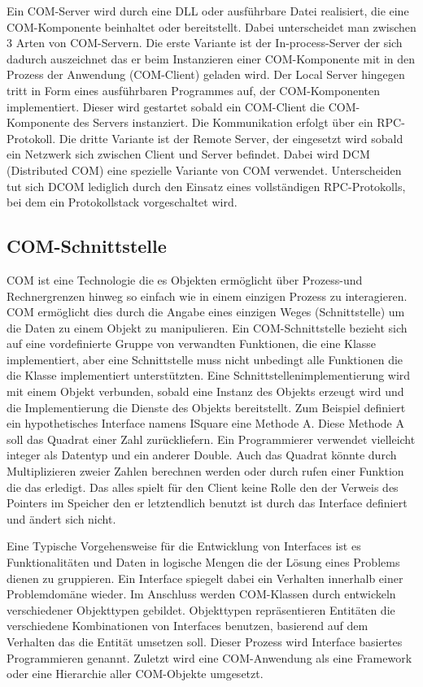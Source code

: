 Ein COM-Server wird durch eine DLL oder ausführbare Datei realisiert, die eine COM-Komponente beinhaltet oder bereitstellt. Dabei unterscheidet man zwischen 3 Arten von COM-Servern. Die erste Variante ist der In-process-Server der sich dadurch auszeichnet das er beim Instanzieren einer COM-Komponente mit in den Prozess der Anwendung (COM-Client) geladen wird. Der Local Server hingegen tritt in Form eines ausführbaren Programmes auf, der COM-Komponenten implementiert. Dieser wird gestartet sobald ein COM-Client die COM-Komponente des Servers instanziert. Die Kommunikation erfolgt über ein RPC-Protokoll. Die dritte Variante ist der Remote Server, der eingesetzt wird sobald ein Netzwerk sich zwischen Client und Server befindet. Dabei wird DCM (Distributed COM) eine spezielle Variante von COM verwendet. Unterscheiden tut sich DCOM lediglich durch den Einsatz eines vollständigen RPC-Protokolls, bei dem ein Protokollstack vorgeschaltet wird. 
 
\subsection{COM-Schnittstelle}
\label{ch:grundlagen:sec:ComponentObjectModel:subsec:COMSchnittstelle}

COM ist eine Technologie die es Objekten ermöglicht über Prozess-und Rechnergrenzen hinweg so einfach wie in einem einzigen Prozess zu interagieren. COM ermöglicht dies durch die Angabe eines einzigen Weges (Schnittstelle) um die Daten zu einem Objekt zu manipulieren. Ein COM-Schnittstelle bezieht sich auf eine vordefinierte Gruppe von verwandten Funktionen, die eine Klasse implementiert, aber eine Schnittstelle muss nicht unbedingt alle Funktionen die die Klasse implementiert unterstützten. Eine Schnittstellenimplementierung wird mit einem Objekt verbunden, sobald eine Instanz des Objekts erzeugt wird und die Implementierung die Dienste des Objekts bereitstellt. Zum Beispiel definiert ein hypothetisches Interface namens ISquare eine Methode A. Diese Methode A soll das Quadrat einer Zahl zurückliefern. Ein Programmierer verwendet vielleicht integer als Datentyp und ein anderer Double. Auch das Quadrat könnte durch Multiplizieren zweier Zahlen berechnen werden oder durch rufen einer Funktion die das erledigt. Das alles spielt für den Client keine Rolle den der Verweis des Pointers im Speicher den er letztendlich benutzt ist durch das Interface definiert und ändert sich nicht. 

Eine Typische Vorgehensweise für die Entwicklung von Interfaces ist es Funktionalitäten und Daten in logische Mengen die der Lösung eines Problems dienen zu gruppieren. Ein Interface spiegelt dabei ein Verhalten innerhalb einer Problemdomäne wieder. Im Anschluss werden COM-Klassen durch entwickeln verschiedener Objekttypen gebildet. Objekttypen repräsentieren Entitäten die verschiedene Kombinationen von Interfaces benutzen, basierend auf dem Verhalten das die Entität umsetzen soll. Dieser Prozess wird Interface basiertes Programmieren genannt. Zuletzt wird eine COM-Anwendung als eine Framework oder eine Hierarchie aller COM-Objekte umgesetzt.

